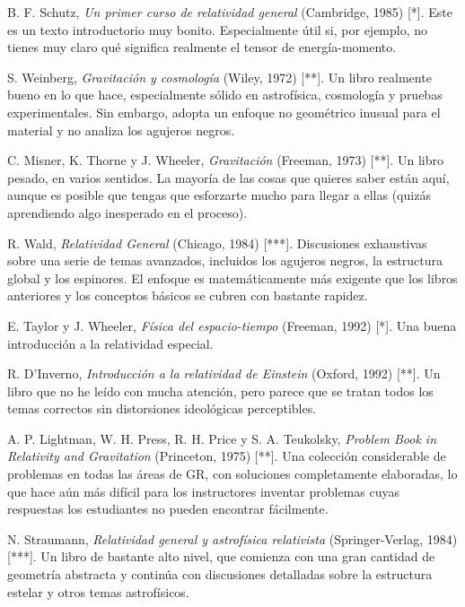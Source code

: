 \documentclass[11pt,b5paper,openany,twoside]{book}
\begin{document}
\begin{thebibliography}{99}


 B. F. Schutz, \textit{Un primer curso de relatividad general} (Cambridge, 1985) [*]. Este es un texto introductorio muy bonito. Especialmente útil si, por ejemplo, no tienes muy claro qué significa realmente el tensor de energía-momento.

 S. Weinberg, \textit{Gravitación y cosmología} (Wiley, 1972) [**]. Un libro realmente bueno en lo que hace, especialmente sólido en astrofísica, cosmología y pruebas experimentales. Sin embargo, adopta un enfoque no geométrico inusual para el material y no analiza los agujeros negros.

 C. Misner, K. Thorne y J. Wheeler, \textit{Gravitación} (Freeman, 1973) [**]. Un libro pesado, en varios sentidos. La mayoría de las cosas que quieres saber están aquí, aunque es posible que tengas que esforzarte mucho para llegar a ellas (quizás aprendiendo algo inesperado en el proceso).

 R. Wald, \textit{Relatividad General} (Chicago, 1984) [***]. Discusiones exhaustivas sobre una serie de temas avanzados, incluidos los agujeros negros, la estructura global y los espinores. El enfoque es matemáticamente más exigente que los libros anteriores y los conceptos básicos se cubren con bastante rapidez.

 E. Taylor y J. Wheeler, \textit{Física del espacio-tiempo} (Freeman, 1992) [*]. Una buena introducción a la relatividad especial.

 R. D'Inverno, \textit{Introducción a la relatividad de Einstein} (Oxford, 1992) [**]. Un libro que no he leído con mucha atención, pero parece que se tratan todos los temas correctos sin distorsiones ideológicas perceptibles.

 A. P. Lightman, W. H. Press, R. H. Price y S. A. Teukolsky, \textit{Problem Book in Relativity and Gravitation} (Princeton, 1975) [**]. Una colección considerable de problemas en todas las áreas de GR, con soluciones completamente elaboradas, lo que hace aún más difícil para los instructores inventar problemas cuyas respuestas los estudiantes no pueden encontrar fácilmente.

 N. Straumann, \textit{Relatividad general y astrofísica relativista} (Springer-Verlag, 1984) [***]. Un libro de bastante alto nivel, que comienza con una gran cantidad de geometría abstracta y continúa con discusiones detalladas sobre la estructura estelar y otros temas astrofísicos.


\end{thebibliography}
\end{document}
